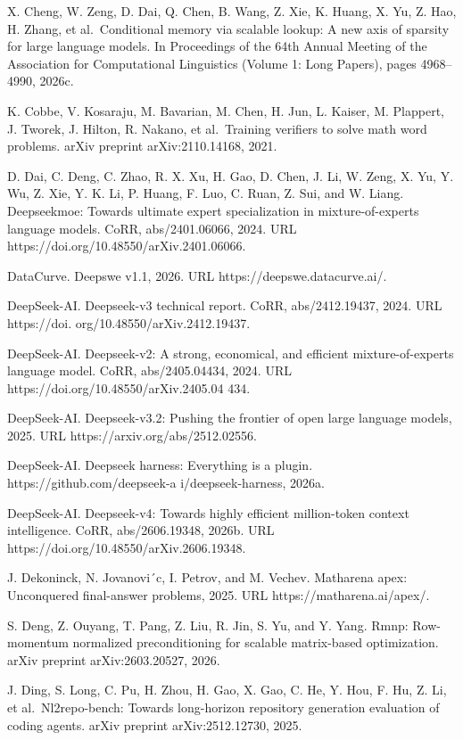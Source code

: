 \documentclass[
  10
]{article}
\begin{document}
X. Cheng, W. Zeng, D. Dai, Q. Chen, B. Wang, Z. Xie, K. Huang, X. Yu, Z.
Hao, H. Zhang, et al.~Conditional memory via scalable lookup: A new axis
of sparsity for large language models. In Proceedings of the 64th Annual
Meeting of the Association for Computational Linguistics (Volume 1: Long
Papers), pages 4968--4990, 2026c.

K. Cobbe, V. Kosaraju, M. Bavarian, M. Chen, H. Jun, L. Kaiser, M.
Plappert, J. Tworek, J. Hilton, R. Nakano, et al.~Training verifiers to
solve math word problems. arXiv preprint arXiv:2110.14168, 2021.

D. Dai, C. Deng, C. Zhao, R. X. Xu, H. Gao, D. Chen, J. Li, W. Zeng, X.
Yu, Y. Wu, Z. Xie, Y. K. Li, P. Huang, F. Luo, C. Ruan, Z. Sui, and W.
Liang. Deepseekmoe: Towards ultimate expert specialization in
mixture-of-experts language models. CoRR, abs/2401.06066, 2024. URL
https://doi.org/10.48550/arXiv.2401.06066.

DataCurve. Deepswe v1.1, 2026. URL https://deepswe.datacurve.ai/.

DeepSeek-AI. Deepseek-v3 technical report. CoRR, abs/2412.19437, 2024.
URL https://doi. org/10.48550/arXiv.2412.19437.

DeepSeek-AI. Deepseek-v2: A strong, economical, and efficient
mixture-of-experts language model. CoRR, abs/2405.04434, 2024. URL
https://doi.org/10.48550/arXiv.2405.04 434.

DeepSeek-AI. Deepseek-v3.2: Pushing the frontier of open large language
models, 2025. URL https://arxiv.org/abs/2512.02556.

DeepSeek-AI. Deepseek harness: Everything is a plugin.
https://github.com/deepseek-a i/deepseek-harness, 2026a.

DeepSeek-AI. Deepseek-v4: Towards highly efficient million-token context
intelligence. CoRR, abs/2606.19348, 2026b. URL
https://doi.org/10.48550/arXiv.2606.19348.

J. Dekoninck, N. Jovanovi´c, I. Petrov, and M. Vechev. Matharena apex:
Unconquered final-answer problems, 2025. URL https://matharena.ai/apex/.

S. Deng, Z. Ouyang, T. Pang, Z. Liu, R. Jin, S. Yu, and Y. Yang. Rmnp:
Row-momentum normalized preconditioning for scalable matrix-based
optimization. arXiv preprint arXiv:2603.20527, 2026.

J. Ding, S. Long, C. Pu, H. Zhou, H. Gao, X. Gao, C. He, Y. Hou, F. Hu,
Z. Li, et al.~Nl2repo-bench: Towards long-horizon repository generation
evaluation of coding agents. arXiv preprint arXiv:2512.12730, 2025.
\end{document}
